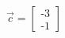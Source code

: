 \documentclass[preview]{standalone}
\begin{document}
\begin{align*}
\vec{c} = \begin{bmatrix} \text{-}3 \\ \text{-}1 \end{bmatrix}
\end{align*}
\end{document}
